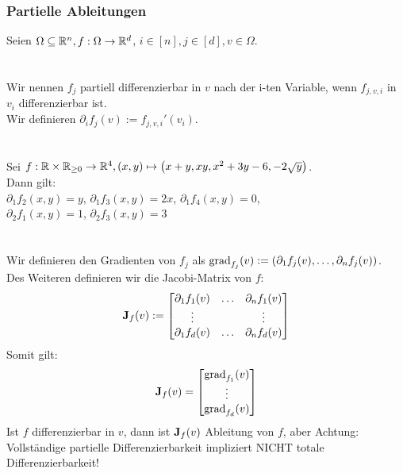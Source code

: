 \subsubsection*{Partielle Ableitungen}
Seien \(\Omega \subseteq \mathbb R^n, f : \Omega \rightarrow \mathbb R^d\), \(i \in [n], j \in [d], v \in \Omega\). \\ \\
 \\
Wir nennen \(f_j\) partiell differenzierbar in \(v\) nach der i-ten Variable, wenn \(f_{j,v,i}\) in \(v_i\) differenzierbar ist.\\
Wir definieren \(\partial_i f_j(v) := f_{j,v,i}'(v_i)\). \\ \\
 \\
Sei \(f: \mathbb R \times \mathbb R_{\ge 0} \rightarrow \mathbb R^4, (x,y) \mapsto \left(x+y, xy, x^2+3y-6, -2\sqrt{y}\right)\). \\
Dann gilt:\\
\(\partial_1f_2(x,y) = y\), \puffer
\(\partial_1f_3(x,y) = 2x\), \puffer
\(\partial_1f_4(x,y) = 0\), \\
\(\partial_2f_1(x,y) = 1\), \puffer
\(\partial_2f_3(x,y) = 3\) \\ \\
 \\
Wir definieren den Gradienten von \(f_j\) als \(\text{grad}_{f_j}(v) := (\partial_1f_j(v), \dots, \partial_nf_j(v))\). \\
Des Weiteren definieren wir die Jacobi-Matrix von \(f\):\[\textbf{J}_f(v) := \begin{bmatrix}
    \partial_1f_1(v) & \hdots & \partial_nf_1(v) \\
    \vdots & & \vdots \\
    \partial_1f_d(v) & \hdots & \partial_nf_d(v)
\end{bmatrix}\] Somit gilt: \[\textbf{J}_f(v) = \begin{bmatrix}
    \text{grad}_{f_1}(v) \\
    \vdots \\
    \text{grad}_{f_d}(v)
\end{bmatrix}\]
Ist \(f\) differenzierbar in \(v\), dann ist \(\textbf{J}_f(v)\) Ableitung von \(f\), aber Achtung: Vollständige partielle Differenzierbarkeit impliziert NICHT totale Differenzierbarkeit! \\ \\
 \\
